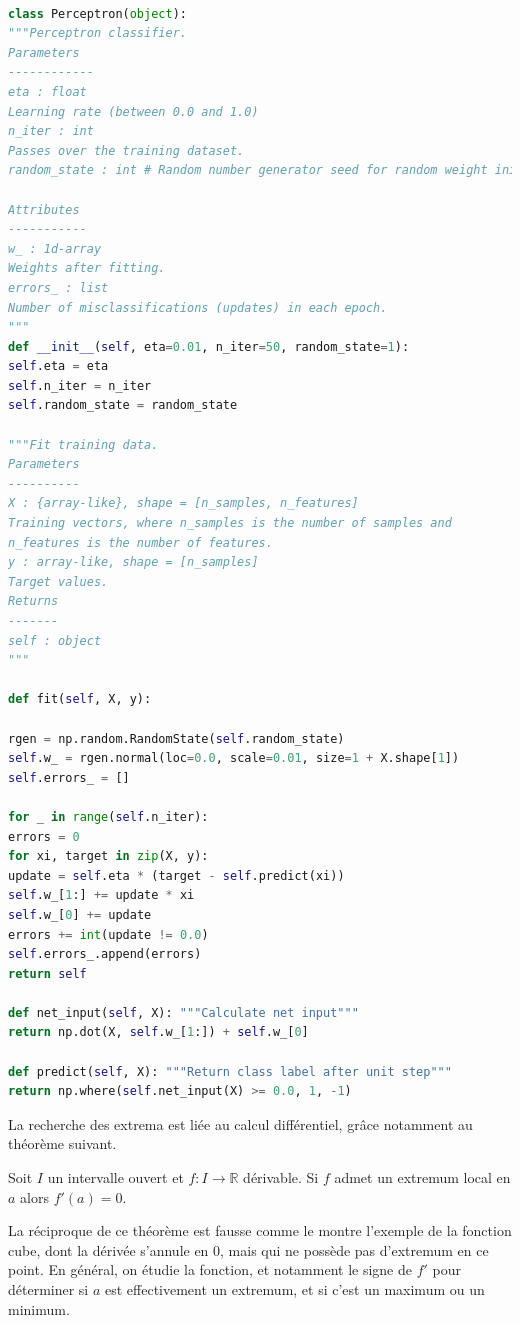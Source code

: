 

	





\begin{lstlisting}[language=python]

class Perceptron(object):
"""Perceptron classifier.
Parameters
------------
eta : float
Learning rate (between 0.0 and 1.0)
n_iter : int
Passes over the training dataset.
random_state : int # Random number generator seed for random weight initialization.

Attributes
-----------
w_ : 1d-array
Weights after fitting.
errors_ : list
Number of misclassifications (updates) in each epoch.
"""
def __init__(self, eta=0.01, n_iter=50, random_state=1):
self.eta = eta
self.n_iter = n_iter
self.random_state = random_state

"""Fit training data.
Parameters
----------
X : {array-like}, shape = [n_samples, n_features]
Training vectors, where n_samples is the number of samples and
n_features is the number of features.
y : array-like, shape = [n_samples]
Target values.
Returns
-------
self : object
"""

def fit(self, X, y):

rgen = np.random.RandomState(self.random_state)
self.w_ = rgen.normal(loc=0.0, scale=0.01, size=1 + X.shape[1])
self.errors_ = []

for _ in range(self.n_iter):
errors = 0
for xi, target in zip(X, y):
update = self.eta * (target - self.predict(xi))
self.w_[1:] += update * xi
self.w_[0] += update
errors += int(update != 0.0)
self.errors_.append(errors)
return self

def net_input(self, X): """Calculate net input"""
return np.dot(X, self.w_[1:]) + self.w_[0]

def predict(self, X): """Return class label after unit step"""
return np.where(self.net_input(X) >= 0.0, 1, -1)
\end{lstlisting}



La recherche des extrema est liée au calcul différentiel, grâce notamment au théorème suivant.
\begin{theorem}
	
	Soit $I$  un intervalle ouvert et $f:  I\rightarrow \mathbb{R} $ dérivable. Si $f$ admet un extremum local en $a$ alors $f'(a) = 0$.
\end{theorem}
La réciproque de ce théorème est fausse comme le montre l'exemple de la fonction cube, dont la dérivée s'annule en $0$, mais qui ne possède pas d'extremum en ce point. En général, on étudie la fonction, et notamment le signe de $f'$ pour déterminer si $a$ est effectivement un extremum, et si c'est un maximum ou un minimum.

